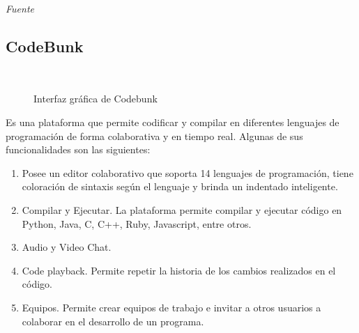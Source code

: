 \emph{Fuente} \cite{pinzas_desarrollo_2013}

\subsection{CodeBunk}
\begin{figure}[h]
  \centering
  \\
  \caption[CodeBunk]{Interfaz gráfica de Codebunk \protect\cite{codebunk}}\label{fig:codebunk}
\end{figure}
Es una plataforma que permite codificar y compilar en diferentes lenguajes de programación de forma colaborativa y en tiempo real. Algunas de sus funcionalidades son las siguientes:\\

\begin{enumerate}
  \item Posee un editor colaborativo que soporta 14 lenguajes de programación, tiene coloración de sintaxis según el lenguaje y brinda un indentado inteligente.
  \item Compilar y Ejecutar. La plataforma permite compilar y ejecutar código en Python, Java, C, C++, Ruby, Javascript, entre otros.
  \item Audio y Video Chat.
  \item Code playback. Permite repetir la historia de los cambios realizados en el código.
  \item Equipos. Permite crear equipos de trabajo e invitar a otros usuarios a colaborar en el desarrollo de un programa.
\end{enumerate}


\newpage
